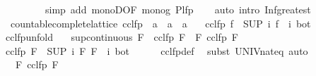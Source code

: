 \begin{isabellebody}
\ \ \ \ \ \ \ \ \ {\isacharparenleft}simp\ add{\isacharcolon}\ monoD{\isacharbrackleft}OF\ mono{\isacharunderscore}g{\isacharbrackright}\ P{\isacharunderscore}lfp{\isacharparenright}\isanewline
\ \ \isamarkupfalse%
\ {\isacharparenleft}auto\ intro{\isacharcolon}\ Inf{\isacharunderscore}greatest{\isacharparenright}\isanewline
{}\isamarkupfalse%
%
\endisatagproof
{\isafoldproof}%
%
\isadelimproof
%
\endisadelimproof
%
\isadelimdocument
%
\endisadelimdocument
%
\isatagdocument
%
\isamarkuptrue%
%
\endisatagdocument
{\isafolddocument}%
%
\isadelimdocument
%
\endisadelimdocument
{}\isamarkupfalse%
\ {\isacharparenleft}\ countable{\isacharunderscore}complete{\isacharunderscore}lattice{\isacharparenright}\ cclfp\ {\isacharcolon}{\isacharcolon}\ {\isachardoublequoteopen}{\isacharparenleft}{\isacharprime}a\ {\isasymRightarrow}\ {\isacharprime}a{\isacharparenright}\ {\isasymRightarrow}\ {\isacharprime}a{\isachardoublequoteclose}\isanewline
\ \ \ {\isachardoublequoteopen}cclfp\ f\ {\isacharequal}\ {\isacharparenleft}SUP\ i{\isachardot}\ {\isacharparenleft}f\ {\isacharcircum}{\isacharcircum}\ i{\isacharparenright}\ bot{\isacharparenright}{\isachardoublequoteclose}\isanewline
\isanewline
{}\isamarkupfalse%
\ cclfp{\isacharunderscore}unfold{\isacharcolon}\isanewline
\ \ \ {\isachardoublequoteopen}sup{\isacharunderscore}continuous\ F{\isachardoublequoteclose}\ \ {\isachardoublequoteopen}cclfp\ F\ {\isacharequal}\ F\ {\isacharparenleft}cclfp\ F{\isacharparenright}{\isachardoublequoteclose}\isanewline
%
\isadelimproof
%
\endisadelimproof
%
\isatagproof
{}\isamarkupfalse%
\ {\isacharminus}\isanewline
\ \ \isamarkupfalse%
\ {\isachardoublequoteopen}cclfp\ F\ {\isacharequal}\ {\isacharparenleft}SUP\ i{\isachardot}\ F\ {\isacharparenleft}{\isacharparenleft}F\ {\isacharcircum}{\isacharcircum}\ i{\isacharparenright}\ bot{\isacharparenright}{\isacharparenright}{\isachardoublequoteclose}\isanewline
\ \ \ \ \isamarkupfalse%
\ cclfp{\isacharunderscore}def\ \isamarkupfalse%
\ {\isacharparenleft}subst\ UNIV{\isacharunderscore}nat{\isacharunderscore}eq{\isacharparenright}\ auto\isanewline
\ \ \isamarkupfalse%
\ \isamarkupfalse%
\ {\isachardoublequoteopen}{\isasymdots}\ {\isacharequal}\ F\ {\isacharparenleft}cclfp\ F{\isacharparenright}{\isachardoublequoteclose}\isanewline

\end{isabellebody}
